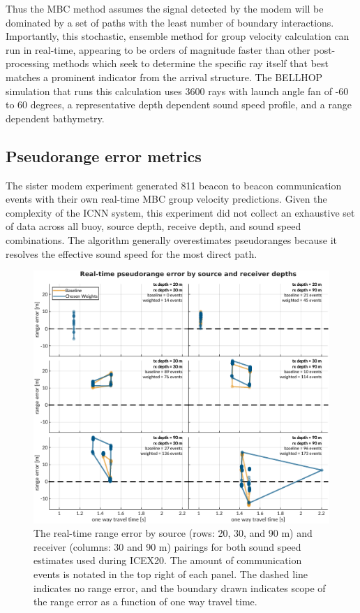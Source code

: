 Thus the MBC method assumes the signal detected by the modem will be dominated by a set of paths with the least number of boundary interactions.
Importantly, this stochastic, ensemble method for group velocity calculation can run in real-time, appearing to be orders of magnitude faster than other post-processing methods which seek to determine the specific ray itself that best matches a prominent indicator from the arrival structure.
The BELLHOP simulation that runs this calculation uses 3600 rays with launch angle fan of -60 to 60 degrees, a representative depth dependent sound speed profile, and a range dependent bathymetry. 

\subsection{Pseudorange error metrics}

The sister modem experiment generated 811 beacon to beacon communication events with their own real-time MBC group velocity predictions.
Given the complexity of the ICNN system, this experiment did not collect an exhaustive set of data across all buoy, source depth, receive depth, and sound speed combinations.
 The algorithm generally overestimates pseudoranges because it resolves the effective sound speed for the most direct path.

\begin{figure}[h!]
  \centering
  \includegraphics[width=\reprintcolumnwidth]{figs/range-error-insitu.pdf}
  \caption{The real-time range error by source (rows: 20, 30, and 90 m) and receiver (columns: 30 and 90 m) pairings for both sound speed estimates used during ICEX20. The amount of communication events is notated in the top right of each panel. The dashed line indicates no range error, and the boundary drawn indicates scope of the range error as a function of one way travel time.}
  \label{fig:range-error-insitu}
\end{figure}

